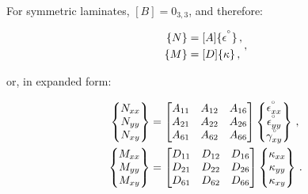 \documentclass[twocolumn, linenumbers, superscriptaddress, nofootinbib]{revtex4-1}
\begin{document}
				For symmetric laminates, $[B] = 0_{3,3}$, and therefore:
				
				\begin{equation}
				\label{eqn::abbd}
					\begin{aligned}
						\{N\} & = [A]\{\epsilon^{\degree}\}\,, \\
						\{M\} & = [D]\{\kappa\}\,,						
					\end{aligned}\,,
				\end{equation}
				
				or, in expanded form:
				
				\begin{equation}
					\begin{aligned}
						\begin{Bmatrix}
							N_{xx} \\
							N_{yy} \\
							N_{xy}
						\end{Bmatrix}
						& =
						\begin{bmatrix}
							A_{11} & A_{12} & A_{16} \\
							A_{21} & A_{22} & A_{26} \\
							A_{61} & A_{62} & A_{66}
						\end{bmatrix}
						\begin{Bmatrix}
							\epsilon^{\degree}_{xx} \\
							\epsilon^{\degree}_{yy} \\
							\gamma^{\degree}_{xy}
						\end{Bmatrix}\,,
						\\
						\begin{Bmatrix}
							M_{xx} \\
							M_{yy} \\
							M_{xy}
						\end{Bmatrix}
						& =
						\begin{bmatrix}
							D_{11} & D_{12} & D_{16} \\
							D_{21} & D_{22} & D_{26} \\
							D_{61} & D_{62} & D_{66}
						\end{bmatrix}
						\begin{Bmatrix}
							\kappa_{xx} \\
							\kappa_{yy} \\
							\kappa_{xy}
						\end{Bmatrix}\,.
					\end{aligned}
				\end{equation}
				
\end{document}
